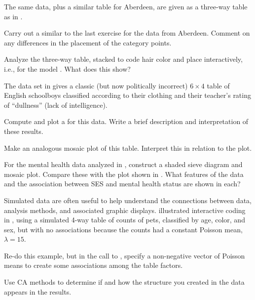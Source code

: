 \documentclass[11pt]{report}\usepackage[]{graphicx}\usepackage[]{color}
\begin{document}
\begin{Exercises}
  \exercise The same data, plus a similar table for Aberdeen, are given as a
  three-way table as  in .
  \begin{enumerate*}
    \item Carry out a similar \ca  to the last exercise 
    for the data from Aberdeen.  
    Comment on any differences in the
    placement of the category points.
    \item Analyze the three-way table, stacked to code hair color and
    place interactively, i.e., for the \loglin model .
    What does this show?
  \end{enumerate*}
  
  \exercise\label{lab:ca-gilby} The data set  in  gives a classic (but now politically incorrect)
  $6 \times 4$ table of English
  schoolboys classified according to their clothing and their teacher's rating of ``dullness'' (lack of intelligence).
  \begin{enumerate*}
    \item Compute and plot a \ca for this data.  Write a brief description and interpretation of these results.
    \item Make an analogous mosaic plot of this table.  Interpret this in relation to the \ca plot.
  \end{enumerate*}
  
  \exercise For the mental health data analyzed in , construct a shaded sieve diagram
  and mosaic plot. Compare these with the \ca plot shown in .  What features of
  the data and the association between SES and mental health status are shown in each?
  
  \exercise Simulated data are often useful to help understand the connections between data, analysis
  methods, and associated graphic displays.
   illustrated interactive coding in \R, using a simulated 4-way table
  of counts of pets, classified by age, color, and sex, but with no associations because the counts had
  a constant Poisson mean, $\lambda=15$. 
  \begin{enumerate*}
    \item Re-do this example, but in the call to , specify
    a non-negative vector of Poisson means to create some associations among the table factors.
    \item Use CA methods to determine if and how the structure you created in the data appears in
    the results.
  \end{enumerate*}
  

\end{Exercises}
\end{document}
